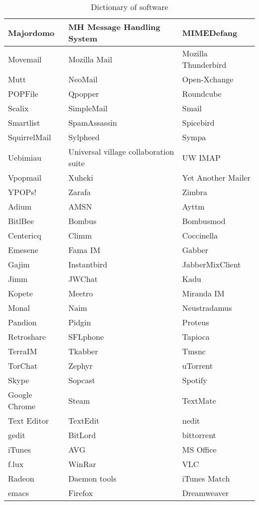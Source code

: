 \begin{table}
\begin{center}
\begin{tabular}{|l|l|l|}\hline
Majordomo&MH Message Handling System&MIMEDefang\\\hline
Movemail&Mozilla Mail&Mozilla Thunderbird\\\hline
Mutt&NeoMail&Open-Xchange\\\hline
POPFile&Qpopper&Roundcube\\\hline
Scalix&SimpleMail&Smail\\\hline
Smartlist&SpamAssassin&Spicebird\\\hline
SquirrelMail&Sylpheed&Sympa\\\hline
Uebimiau&Universal village collaboration suite&UW IMAP\\\hline
Vpopmail&Xuheki&Yet Another Mailer\\\hline
YPOPs!&Zarafa&Zimbra\\\hline
Adium&AMSN&Ayttm\\\hline
BitlBee&Bombus&Bombusmod\\\hline
Centericq&Climm&Coccinella\\\hline
Emesene&Fama IM&Gabber\\\hline
Gajim&Instantbird&JabberMixClient\\\hline
Jimm&JWChat&Kadu\\\hline
Kopete&Meetro&Miranda IM\\\hline
Monal&Naim&Neustradamus\\\hline
Pandion&Pidgin&Proteus\\\hline
Retroshare&SFLphone&Tapioca\\\hline
TerraIM&Tkabber&Tmsnc\\\hline
TorChat&Zephyr&uTorrent\\\hline
Skype&Sopcast&Spotify\\\hline
Google Chrome&Steam&TextMate\\\hline
Text Editor&TextEdit&nedit\\\hline
gedit&BitLord&bittorrent\\\hline
iTunes&AVG&MS Office\\\hline
f.lux&WinRar&VLC\\\hline
Radeon&Daemon tools&iTunes Match\\\hline
emacs&Firefox&Dreamweaver\\\hline
\end{tabular}
\end{center}
\caption{Dictionary of software}
\end{table}


